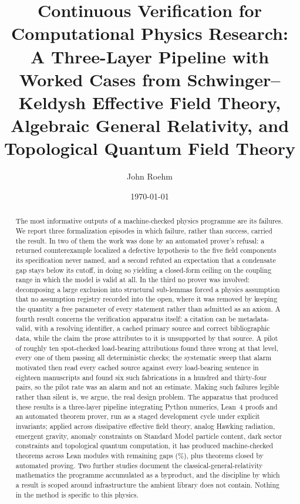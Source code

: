 \documentclass[11pt]{article}
\title{Continuous Verification for Computational Physics Research:\\
A Three-Layer Pipeline with Worked Cases from Schwinger--Keldysh
Effective Field Theory, Algebraic General Relativity, and
Topological Quantum Field Theory}
\author{John Roehm}
\date{\today}
\begin{document}
\maketitle

\begin{abstract}
The most informative outputs of a machine-checked physics programme are
its failures. We report three formalization episodes in which failure,
rather than success, carried the result. In two of them the work was
done by an automated prover's refusal: a returned counterexample
localized a defective hypothesis to the five field components its
specification never named, and a second refuted an expectation that a
condensate gap stays below its cutoff, in doing so yielding a
closed-form ceiling on the coupling range in which the model is valid
at all. In the third no prover was involved: decomposing a large
exclusion into structural sub-lemmas forced a physics assumption that
no assumption registry recorded into the open, where it was removed by
keeping the quantity a free parameter of every statement rather than
admitted as an axiom. A fourth result concerns the
verification apparatus itself: a citation can be metadata-valid, with
a resolving identifier, a cached primary source and correct
bibliographic data, while the claim the prose attributes to it is unsupported by
that source. A pilot of roughly ten spot-checked load-bearing
attributions found three wrong at that level, every one of them
passing all deterministic checks; the systematic sweep that alarm
motivated then read every cached source against every load-bearing
sentence in eighteen manuscripts and found six such fabrications in a
hundred and thirty-four pairs, so the pilot rate was an alarm and not
an estimate. Making such failures legible rather than silent
is, we argue, the real design problem. The apparatus that produced
these results is a three-layer pipeline integrating Python numerics,
Lean~4 proofs and an automated theorem prover, run as a staged
development cycle under explicit invariants; applied across
dissipative effective field theory, analog Hawking radiation, emergent
gravity, anomaly constraints on Standard Model particle content, dark
sector constraints and topological quantum computation, it has produced
\totaltheorems{} machine-checked theorems across \leanmodules{} Lean
modules with \sorrycount{} remaining gaps (\sorrypercent\%), plus
\aristotleproved{} theorems closed by automated proving. Two further
studies document the classical-general-relativity mathematics the
programme accumulated as a byproduct, and the discipline by which a
result is scoped around infrastructure the ambient library does not
contain. Nothing in the method is specific to this physics.
\end{abstract}
\end{document}
